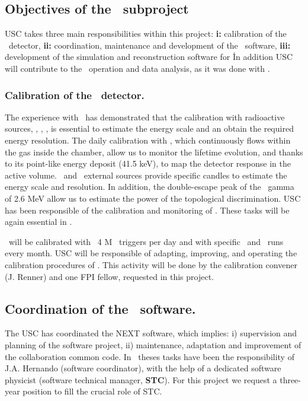 \subsection{Objectives of the \sUSC\ subproject}
\label{sec.obj.usc}

\indent


USC takes three main responsibilities within this project: {\bf i:} calibration of the \Next\ detector, {\bf ii:} coordination, maintenance and development of the \Next\ software, {\bf iii:} development of the simulation and reconstruction software for \HDEMO\. In addition USC will contribute to the \Next\ operation and data analysis, as it was done with \NEW.

\subsubsection{Calibration of the \Next\ detector.}

The experience with \NEW\ has demonstrated that the calibration with radioactive sources, \KR, \CS, \TL, is essential to estimate the energy scale and an obtain the required energy resolution. The daily calibration with \KR, which continuously flows within the gas inside the chamber, allow us to monitor the lifetime evolution, and thanks to its point-like energy deposit (41.5 keV), to map the detector response in the active volume. \CS\ and \TL\ external sources  provide specific candles to estimate the energy scale and resolution. In addition, the double-escape peak of the \TL\ gamma of 2.6 MeV allow us to estimate the power of the topological discrimination. USC has been responsible of the calibration and monitoring of \NEW. These tasks will be again essential in \Next. 

\Next\ will be calibrated with ~4 M \KR\ triggers per day and with specific \CS\ and \TL\ runs every month. USC will be responsible of adapting, improving, and operating the calibration procedures of \Next. This activity will be done by the calibration convener (J. Renner) and one FPI fellow, requested in this project. 

\subsection{Coordination of the \Next\ software.}

The USC has coordinated the NEXT software, which implies: i) supervision and planning of the software project, ii) maintenance, adaptation and improvement of the collaboration common code. In \NEW\ theses tasks have been the responsibility of J.A. Hernando (software coordinator), with the help of a dedicated software physicist (software technical manager, {\bf STC}). For this project we request a three-year position to fill the crucial role of STC. 

